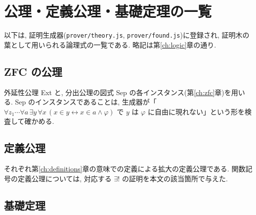 \chapter{公理・定義公理・基礎定理の一覧}\label{app:registry}

以下は, 証明生成器(\texttt{prover/theory.js}, \texttt{prover/found.js})に登録され, 証明木の葉として用いられる論理式の一覧である. 略記は第\ref{ch:logic}章の通り.

\section{ZFC の公理}

外延性公理 \textsf{Ext} と, 分出公理の図式 \textsf{Sep} の各インスタンス(第\ref{ch:zfc}章)を用いる. \textsf{Sep} のインスタンスであることは, 生成器が「$\forall z_1 \cdots \forall a\,\exists y\,\forall x\,(x \in y \leftrightarrow x \in a \land \varphi)$ で $y$ は $\varphi$ に自由に現れない」という形を検査して確かめる.


\section{定義公理}

それぞれ第\ref{ch:definitions}章の意味での定義による拡大の定義公理である. 関数記号の定義公理については, 対応する $\exists !$ の証明を本文の該当箇所で与えた.


\section{基礎定理}\label{app:found}

